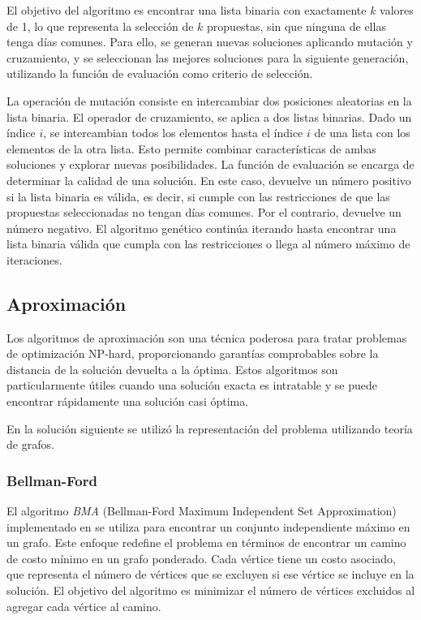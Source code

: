 \documentclass[10pt]{article} %
\begin{document}
	El objetivo del algoritmo es encontrar una lista binaria con exactamente $k$ valores de 1, lo que representa la selección de $k$ propuestas, sin que ninguna de ellas tenga días comunes. Para ello, se generan nuevas soluciones aplicando mutación y cruzamiento, y se seleccionan las mejores soluciones para la siguiente generación, utilizando la función de evaluación como criterio de selección. 
	
	La operación de mutación consiste en intercambiar dos posiciones aleatorias en la lista binaria. El operador de cruzamiento, se aplica a dos listas binarias. Dado un índice $i$, se intercambian todos los elementos hasta el índice $i$ de una lista con los elementos de la otra lista. Esto permite combinar características de ambas soluciones y explorar nuevas posibilidades. La función de evaluación se encarga de determinar la calidad de una solución. En este caso, devuelve un número positivo si la lista binaria es válida, es decir, si cumple con las restricciones de que las propuestas seleccionadas no tengan días comunes. Por el contrario, devuelve un número negativo.  El algoritmo genético continúa iterando hasta encontrar una lista binaria válida que cumpla con las restricciones o llega al n\'umero m\'aximo de iteraciones.
	
	\subsection{Aproximaci\'on}

	Los algoritmos de aproximación son una técnica poderosa para tratar problemas de optimización NP-hard, proporcionando garantías comprobables sobre la distancia de la solución devuelta a la óptima. Estos algoritmos son particularmente útiles cuando una solución exacta es intratable y se puede encontrar rápidamente una solución casi óptima.
	
	En la soluci\'on siguiente se utiliz\'o la representaci\'on del problema utilizando teor\'ia de grafos.
	
	\subsubsection{Bellman-Ford} 
	
	El algoritmo \textit{BMA} (Bellman-Ford Maximum Independent Set Approximation) implementado en \cite{bellman-ford}  se utiliza para encontrar un conjunto independiente máximo en un grafo. Este enfoque redefine el problema en términos de encontrar un camino de costo mínimo en un grafo ponderado. Cada vértice tiene un costo asociado, que representa el número de vértices que se excluyen si ese vértice se incluye en la solución. El objetivo del algoritmo es minimizar el número de vértices excluidos al agregar cada vértice al camino.
	
\end{document}
